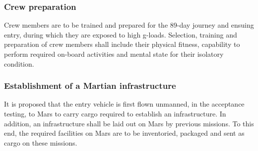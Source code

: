 \subsubsection{Crew preparation}
Crew members are to be trained and prepared for the 89-day journey and ensuing entry, during which they are exposed to high g-loads. Selection, training and preparation of crew members shall include their physical fitness, capability to perform required on-board activities and mental state for their isolatory condition.

\subsubsection{Establishment of a Martian infrastructure}
It is proposed that the entry vehicle is first flown unmanned, in the acceptance testing, to Mars to carry cargo required to establish an infrastructure. In addition, an infrastructure shall be laid out on Mars by previous missions. To this end, the required facilities on Mars are to be inventoried, packaged and sent as cargo on these missions.



